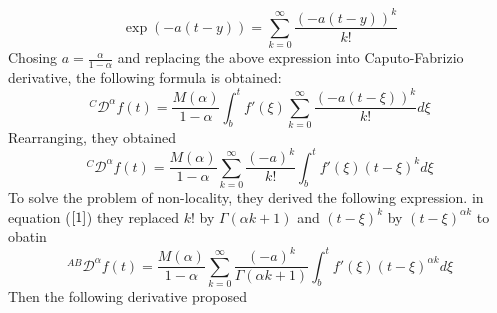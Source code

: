 \documentclass[twoside]{book}
\begin{document}
{\begin{equation}
    \exp(-a(t-y))  = \sum_{k=0}^{\infty} \frac{(-a(t-y))^k}{k!}
\end{equation}
Chosing $a = \frac{\alpha}{1-\alpha}$ and replacing the above expression into Caputo-Fabrizio derivative, the following formula is obtained:
\begin{equation}
    ^{C}\mathcal{D}^{\alpha} f(t) = \frac{M(\alpha)}{1-\alpha} \int_b^t f'(\xi) \sum_{k=0}^{\infty}  \frac{(-a(t-\xi))^k}{k!} d\xi
\end{equation}
Rearranging, they obtained
\begin{equation}
    \label{1}
    ^{C}\mathcal{D}^{\alpha} f(t) = \frac{M(\alpha)}{1-\alpha} \sum_{k=0}^{\infty} \frac{(-a)^k}{k!} \int_b^t f'(\xi)   (t-\xi)^k d\xi
\end{equation}
To solve the problem of non-locality, they derived the following expression. in equation ($\ref{1}$) they replaced $k!$ by $\Gamma{(\alpha k +1)}$ and  $(t-\xi)^k$ by $(t-\xi)^{\alpha k}$ to obatin
\begin{equation}
    \label{AB}
    ^{AB}\mathcal{D}^{\alpha} f(t) = \frac{M(\alpha)}{1-\alpha} \sum_{k=0}^\infty \frac{(-a)^{k}}{\Gamma{(\alpha k +1)}} \int_b^t f'(\xi) (t-\xi)^{\alpha k}  d\xi
\end{equation}
Then the following derivative proposed

}
\end{document}
